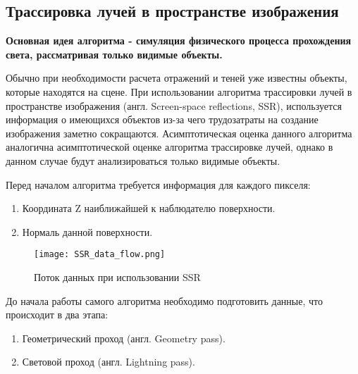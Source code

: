 \subsection{Трассировка лучей в пространстве изображения}
\textbf{Основная идея алгоритма - симуляция физического процесса прохождения света, рассматривая только видимые объекты.} \par
Обычно при необходимости расчета отражений и теней уже известны объекты, которые находятся на сцене. При использовании алгоритма трассировки лучей в пространстве изображения (англ. Screen-space reflections, SSR), используется информация о имеющихся
объектов из-за чего трудозатраты на создание изображения заметно сокращаются.
Асимптотическая оценка данного алгоритма аналогична асимптотической оценке алгоритма трассировке лучей, однако в данном случае будут анализироваться только видимые объекты.\cite{SSR}

Перед началом алгоритма требуется информация для каждого пикселя:
\begin{enumerate}
	\item Координата Z наиближайшей к наблюдателю поверхности.
	\item Нормаль данной поверхности.
\end{enumerate}

\begin{figure}[H]
	\centering
	\texttt{[image: SSR\_data\_flow.png]}
	\caption{Поток данных при использовании SSR}
	\label{fig:SSR_data_flow}
\end{figure} 

До начала работы самого алгоритма необходимо подготовить данные, что происходит в два этапа:
\begin{enumerate}
	\item Геометрический проход (англ. Geometry pass).
	\item Световой проход (англ. Lightning pass).
\end{enumerate}

